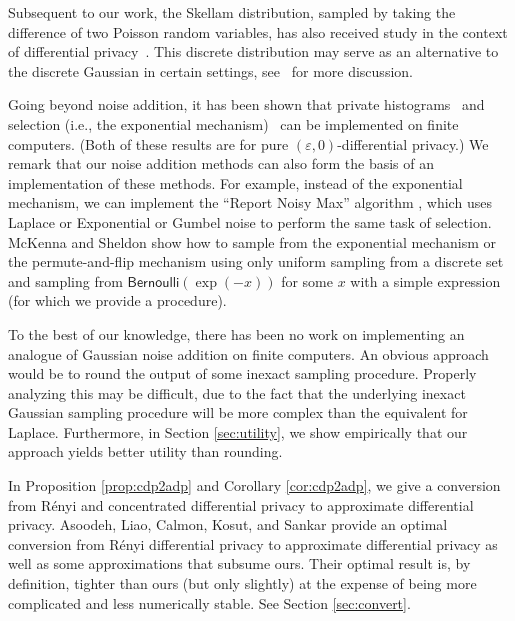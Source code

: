 \documentclass{jpc}
\newcommand{\eps}{\varepsilon}
\newcommand{\bern}{\mathsf{Bernoulli}}
\begin{document}
Subsequent to our work, the Skellam distribution, sampled by taking the difference of two Poisson random variables, has also received study in the context of differential privacy~\cite{AgarwalKL21,bao2022distributed}.
This discrete distribution may serve as an alternative to the discrete Gaussian in certain settings, see~\cite{AgarwalKL21} for more discussion.

Going beyond noise addition, it has been shown that private histograms~\citep{BalcerV17} and selection (i.e., the exponential mechanism)~\citep{Ilvento19} can be implemented on finite computers. (Both of these results are for pure $(\eps,0)$-differential privacy.)
We remark that our noise addition methods can also form the basis of an implementation of these methods. For example, instead of the exponential mechanism, we can implement the ``Report Noisy Max'' algorithm \citep{DworkR14}, which uses Laplace or Exponential \citep{McKennaS20} or Gumbel \citep{Gumbel} noise to perform the same task of selection. McKenna and Sheldon \cite{McKennaS20} show how to sample from the exponential mechanism or the permute-and-flip mechanism using only uniform sampling from a discrete set and sampling from $\bern(\exp(-x))$ for some $x$ with a simple expression (for which we provide a procedure).

To the best of our knowledge, there has been no work on implementing an analogue of Gaussian noise addition on finite computers. An obvious approach would be to round the output of some inexact sampling procedure. Properly analyzing this may be difficult, due to the fact that the underlying inexact Gaussian sampling procedure will be more complex than the equivalent for Laplace. Furthermore, in Section \ref{sec:utility}, we show empirically that our approach yields better utility than rounding.





In Proposition \ref{prop:cdp2adp} and Corollary \ref{cor:cdp2adp}, we give a conversion from R\'enyi and concentrated differential privacy to approximate differential privacy. Asoodeh, Liao, Calmon, Kosut, and Sankar \cite{AsoodehLCKS20} provide an optimal conversion from R\'enyi differential privacy to approximate differential privacy as well as some approximations that subsume ours. Their optimal result is, by definition, tighter than ours (but only slightly) at the expense of being more complicated and less numerically stable. See Section \ref{sec:convert}.
\end{document}
